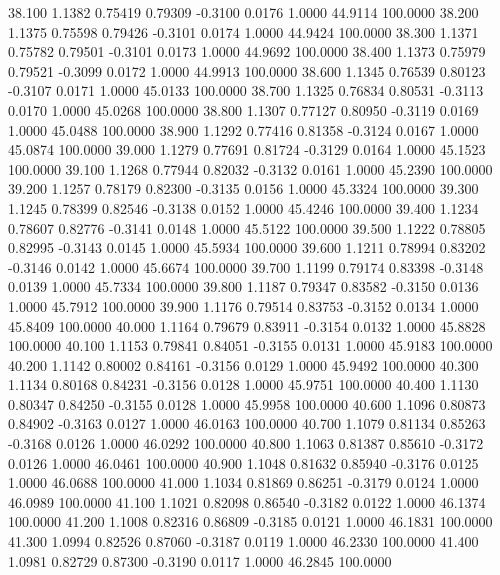   38.100   1.1382   0.75419   0.79309  -0.3100   0.0176   1.0000  44.9114 100.0000
  38.200   1.1375   0.75598   0.79426  -0.3101   0.0174   1.0000  44.9424 100.0000
  38.300   1.1371   0.75782   0.79501  -0.3101   0.0173   1.0000  44.9692 100.0000
  38.400   1.1373   0.75979   0.79521  -0.3099   0.0172   1.0000  44.9913 100.0000
  38.600   1.1345   0.76539   0.80123  -0.3107   0.0171   1.0000  45.0133 100.0000
  38.700   1.1325   0.76834   0.80531  -0.3113   0.0170   1.0000  45.0268 100.0000
  38.800   1.1307   0.77127   0.80950  -0.3119   0.0169   1.0000  45.0488 100.0000
  38.900   1.1292   0.77416   0.81358  -0.3124   0.0167   1.0000  45.0874 100.0000
  39.000   1.1279   0.77691   0.81724  -0.3129   0.0164   1.0000  45.1523 100.0000
  39.100   1.1268   0.77944   0.82032  -0.3132   0.0161   1.0000  45.2390 100.0000
  39.200   1.1257   0.78179   0.82300  -0.3135   0.0156   1.0000  45.3324 100.0000
  39.300   1.1245   0.78399   0.82546  -0.3138   0.0152   1.0000  45.4246 100.0000
  39.400   1.1234   0.78607   0.82776  -0.3141   0.0148   1.0000  45.5122 100.0000
  39.500   1.1222   0.78805   0.82995  -0.3143   0.0145   1.0000  45.5934 100.0000
  39.600   1.1211   0.78994   0.83202  -0.3146   0.0142   1.0000  45.6674 100.0000
  39.700   1.1199   0.79174   0.83398  -0.3148   0.0139   1.0000  45.7334 100.0000
  39.800   1.1187   0.79347   0.83582  -0.3150   0.0136   1.0000  45.7912 100.0000
  39.900   1.1176   0.79514   0.83753  -0.3152   0.0134   1.0000  45.8409 100.0000
  40.000   1.1164   0.79679   0.83911  -0.3154   0.0132   1.0000  45.8828 100.0000
  40.100   1.1153   0.79841   0.84051  -0.3155   0.0131   1.0000  45.9183 100.0000
  40.200   1.1142   0.80002   0.84161  -0.3156   0.0129   1.0000  45.9492 100.0000
  40.300   1.1134   0.80168   0.84231  -0.3156   0.0128   1.0000  45.9751 100.0000
  40.400   1.1130   0.80347   0.84250  -0.3155   0.0128   1.0000  45.9958 100.0000
  40.600   1.1096   0.80873   0.84902  -0.3163   0.0127   1.0000  46.0163 100.0000
  40.700   1.1079   0.81134   0.85263  -0.3168   0.0126   1.0000  46.0292 100.0000
  40.800   1.1063   0.81387   0.85610  -0.3172   0.0126   1.0000  46.0461 100.0000
  40.900   1.1048   0.81632   0.85940  -0.3176   0.0125   1.0000  46.0688 100.0000
  41.000   1.1034   0.81869   0.86251  -0.3179   0.0124   1.0000  46.0989 100.0000
  41.100   1.1021   0.82098   0.86540  -0.3182   0.0122   1.0000  46.1374 100.0000
  41.200   1.1008   0.82316   0.86809  -0.3185   0.0121   1.0000  46.1831 100.0000
  41.300   1.0994   0.82526   0.87060  -0.3187   0.0119   1.0000  46.2330 100.0000
  41.400   1.0981   0.82729   0.87300  -0.3190   0.0117   1.0000  46.2845 100.0000
